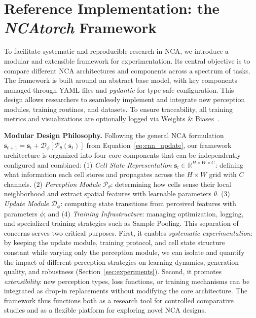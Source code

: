 \documentclass[10pt]{article} %
\begin{document}
\section{Reference Implementation: the \textit{NCAtorch} Framework}
\label{sec:framework}
To facilitate systematic and reproducible research in NCA, we introduce a modular and extensible framework for experimentation. Its central objective is to compare different NCA architectures and components across a spectrum of tasks. The framework is built around an abstract base model, with key components managed through YAML files and \textit{pydantic} for type-safe configuration. This design allows researchers to seamlessly implement and integrate new perception modules, training routines, and datasets. To ensure traceability, all training metrics and visualizations are optionally logged via Weights \& Biases~\citep{wandb}.

\noindent\textbf{Modular Design Philosophy.}
Following the general NCA formulation $\mathbf{s}_{t+1} = \mathbf{s}_{t} + \mathcal{D}_\phi[\mathcal{P}_\theta(\mathbf{s}_{t})]$ from Equation~\ref{eq:cnn_update}, our framework architecture is organized into four core components that can be independently configured and combined: (1) \textit{Cell State Representation} $\mathbf{s}_t \in \mathbb{R}^{H \times W \times C}$: defining what information each cell stores and propagates across the $H \times W$ grid with $C$ channels. (2) \textit{Perception Module} $\mathcal{P}_\theta$: determining how cells sense their local neighborhood and extract spatial features with learnable parameters $\theta$. (3) \textit{Update Module} $\mathcal{D}_\phi$: computing state transitions from perceived features with parameters $\phi$; and (4) \textit{Training Infrastructure}: managing optimization, logging, and specialized training strategies such as Sample Pooling. This separation of concerns serves two critical purposes. First, it enables \textit{systematic experimentation}: by keeping the update module, training protocol, and cell state structure constant while varying only the perception module, we can isolate and quantify the impact of different perception strategies on learning dynamics, generation quality, and robustness (Section~\ref{sec:experiments}). Second, it promotes \textit{extensibility}: new perception types, loss functions, or training mechanisms can be integrated as drop-in replacements without modifying the core architecture. The framework thus functions both as a research tool for controlled comparative studies and as a flexible platform for exploring novel NCA designs.
\end{document}
